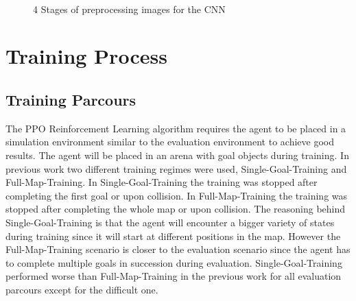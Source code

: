 \begin{figure}
     \centering
     \qquad
     \\
     \qquad
     \caption{4 Stages of preprocessing images for the CNN}
     \label{fig:4bildchen}
\end{figure}


\section{Training Process}


\subsection*{Training Parcours}
The PPO Reinforcement Learning algorithm requires the agent to be placed in a simulation environment similar to the evaluation environment to achieve good results. The agent will be placed in an arena with goal objects during training. In previous work \autocite{maximilian} two different training regimes were used, Single-Goal-Training and Full-Map-Training. In Single-Goal-Training the training was stopped after completing the first goal or upon collision. In Full-Map-Training the training was stopped after completing the whole map or upon collision. The reasoning behind Single-Goal-Training is that the agent will encounter a bigger variety of states during training since it will start at different positions in the map. However the Full-Map-Training scenario is closer to the evaluation scenario since the agent has to complete multiple goals in succession during evaluation.
Single-Goal-Training performed worse than Full-Map-Training in the previous work \autocite{maximilian} for all evaluation parcours except for the difficult one.

